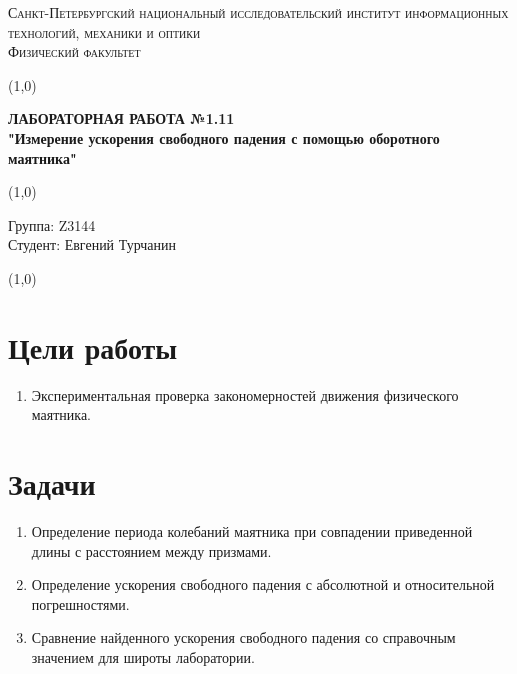 \documentclass[a4paper]{article}
\date{}
\begin{document}
\begin{center}
\textsc{Санкт-Петербургский национальный исследовательский институт информационных технологий, механики и оптики\\[3mm]
Физический факультет} \\[3mm]

\end{center}
\vspace{5mm}
\line(1,0){\textwidth}
\begin{center}
\textbf{ЛАБОРАТОРНАЯ РАБОТА №1.11\\}
\textbf{"Измерение ускорения свободного падения с помощью оборотного маятника"}
\end{center}
\vspace{2mm}
\line(1,0){\textwidth}
\vspace{5mm}
\begin{minipage}{0.4\textwidth}
    Группа: Z3144 \\
    Студент: Евгений Турчанин\\
    \vspace{1mm}
\end{minipage}
\hfill
\vspace{1mm}
\line(1,0){\textwidth}

\section{\textbf{Цели работы}}
\begin{enumerate}
	\item Экспериментальная проверка закономерностей движения физического маятника.
\end{enumerate}

\section {\textbf{Задачи}}
\begin{enumerate}
	\item Определение периода колебаний маятника при совпадении приведенной длины с расстоянием между призмами.
	\item Определение ускорения свободного падения с абсолютной и относительной погрешностями.
	\item Сравнение найденного ускорения свободного падения со справочным значением для широты лаборатории.
\end{enumerate}


\section{}
\end{document}

